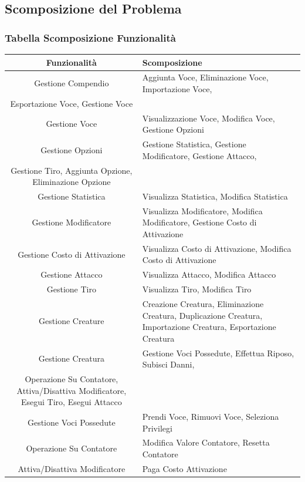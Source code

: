 \documentclass[a4paper, 11pt]{article}
\let\newline\\
\begin{document}
\clearpage
\newpage
\subsection{Scomposizione del Problema}
\subsubsection*{Tabella Scomposizione Funzionalità}
\begin{adjustwidth}{-1cm}{-1cm}
\begin{center}
    \begin{tabular}{|c|p{11cm}|}
        \hline
        \textbf{Funzionalità} & \textbf{Scomposizione} \\\hline
        Gestione Compendio & Aggiunta Voce, Eliminazione Voce, Importazione Voce, \newline Esportazione Voce, Gestione Voce \\\hline
        Gestione Voce & Visualizzazione Voce, Modifica Voce, Gestione Opzioni \\\hline
        Gestione Opzioni & Gestione Statistica, Gestione Modificatore, Gestione Attacco, \newline Gestione Tiro, Aggiunta Opzione, Eliminazione Opzione \\\hline
        Gestione Statistica & Visualizza Statistica, Modifica Statistica \\\hline
        Gestione Modificatore & Visualizza Modificatore, Modifica Modificatore, Gestione Costo di Attivazione \\\hline
        Gestione Costo di Attivazione & Visualizza Costo di Attivazione, Modifica Costo di Attivazione \\\hline
        Gestione Attacco & Visualizza Attacco, Modifica Attacco \\\hline
        Gestione Tiro & Visualizza Tiro, Modifica Tiro \\\hline
        Gestione Creature & Creazione Creatura, Eliminazione Creatura, Duplicazione Creatura, Importazione Creatura, Esportazione Creatura \\\hline
        Gestione Creatura & Gestione Voci Possedute, Effettua Riposo, Subisci Danni, \newline Operazione Su Contatore, Attiva/Disattiva Modificatore, Esegui Tiro, Esegui Attacco \\\hline
        Gestione Voci Possedute & Prendi Voce, Rimuovi Voce, Seleziona Privilegi \\\hline
        Operazione Su Contatore & Modifica Valore Contatore, Resetta Contatore \\\hline
        Attiva/Disattiva Modificatore & Paga Costo Attivazione \\\hline
    \end{tabular}
\end{center}
\end{adjustwidth}
\end{document}
